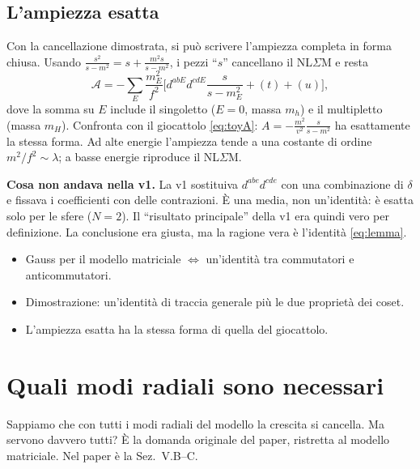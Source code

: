 \documentclass[11pt,a4paper]{article}
\numberwithin{equation}{section}
\theoremstyle{remark}
\begin{document}
\subsection{L'ampiezza esatta}

Con la cancellazione dimostrata, si può scrivere l'ampiezza completa in forma chiusa. Usando $\frac{s^2}{s-m^2}=s+\frac{m^2s}{s-m^2}$, i pezzi ``$s$'' cancellano il NL$\Sigma$M e resta
\begin{equation}
\mathcal A=-\sum_E\frac{m_E^2}{f^2}\Big[d^{abE}d^{cdE}\frac{s}{s-m_E^2}+(t)+(u)\Big],
\end{equation}
dove la somma su $E$ include il singoletto ($E=0$, massa $m_h$) e il multipletto (massa $m_H$). Confronta con il giocattolo \eqref{eq:toyA}: $A=-\frac{m^2}{v^2}\frac{s}{s-m^2}$ ha esattamente la stessa forma. Ad alte energie l'ampiezza tende a una costante di ordine $m^2/f^2\sim\lambda$; a basse energie riproduce il NL$\Sigma$M.

\begin{attento}
\textbf{Cosa non andava nella v1.} La v1 sostituiva $d^{abe}d^{cde}$ con una combinazione di $\delta$ e fissava i coefficienti con delle contrazioni. È una media, non un'identità: è esatta solo per le sfere ($N=2$). Il ``risultato principale'' della v1 era quindi vero per definizione. La conclusione era giusta, ma la ragione vera è l'identità \eqref{eq:lemma}.
\end{attento}

\begin{porta}
\begin{itemize}[nosep]
\item Gauss per il modello matriciale $\Leftrightarrow$ un'identità tra commutatori e anticommutatori.
\item Dimostrazione: un'identità di traccia generale più le due proprietà dei coset.
\item L'ampiezza esatta ha la stessa forma di quella del giocattolo.
\end{itemize}
\end{porta}

\section{Quali modi radiali sono necessari}
\label{cap:quali}

\begin{dove}
Sappiamo che con tutti i modi radiali del modello la crescita si cancella. Ma servono davvero tutti? È la domanda originale del paper, ristretta al modello matriciale. Nel paper è la Sez.~V.B--C.
\end{dove}
\end{document}
